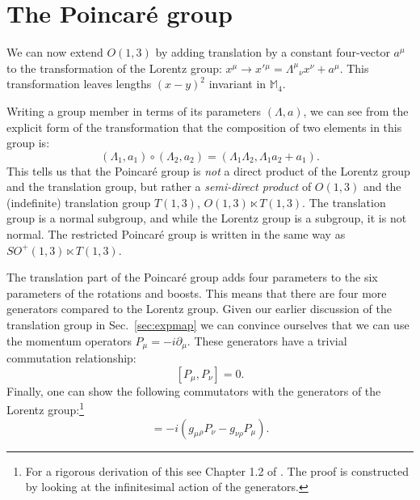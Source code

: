 \documentclass[notes.tex]{subfiles}
\begin{document}
\section{The Poincaré group}
We can now extend $O(1,3)$ by adding translation by a constant four-vector $a^\mu$ to the transformation of the Lorentz group:  $x^\mu \to x'{}^\mu = \Lambda^\mu{}_\nu x^\nu + a^\mu$. This transformation leaves lengths $(x-y)^2$ invariant in $\mathbb{M}_4$.

Writing a group member in terms of its parameters $(\Lambda, a)$, we can see  from the explicit form of the transformation that the composition of two elements in this group is:
\[(\Lambda_1, a_1)\circ(\Lambda_2, a_2) = (\Lambda_1\Lambda_2, \Lambda_1a_2 + a_1).\]
This tells us that the Poincar\'{e} group is {\it not} a direct product of the Lorentz group and the translation group, but rather a {\it semi-direct product} of $O(1,3)$ and the (indefinite) translation group $T(1,3)$, $O(1,3) \ltimes T(1,3)$. The translation group is a normal subgroup, and while the Lorentz group is a subgroup, it is not normal. The restricted Poincaré group is written in the same way as $SO^+(1,3) \ltimes T(1,3)$.

The translation part of the Poincaré group adds four parameters to the six parameters of the rotations and boosts. This means that there are four more generators compared to the Lorentz group. Given our earlier discussion of the translation group in Sec.~\ref{sec:expmap} we can convince ourselves that we can use the momentum operators $P_\mu=-i\partial_\mu$. These generators have a trivial commutation relationship:
\begin{equation}\label{eq:poco2}
[P_\mu, P_\nu] = 0.
\end{equation}
Finally, one can show the following commutators with the generators of the Lorentz group:\footnote{For a rigorous derivation of this see Chapter 1.2 of \cite{IntrSUSY2010}. The proof is constructed by looking at the infinitesimal action of the generators.}
\begin{equation}
[M_\mu{}_\nu, P_\rho] = -i(g_\mu{}_\rho P_\nu - g_{\nu \rho} P_\mu).
\label{eq:poco3}
\end{equation}
\end{document}
